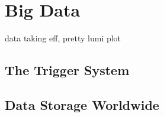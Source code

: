 \chapter{Big Data\label{ch:data}}

data taking eff, pretty lumi plot

\section{The Trigger System\label{sec:trigger}}

\section{Data Storage Worldwide\label{sec:storage}}



